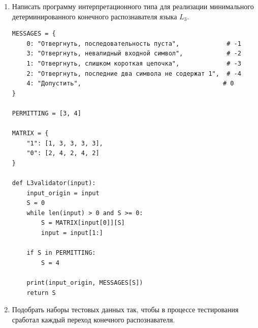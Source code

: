 \documentclass[a4paper,14pt]{extarticle}
\begin{document}
\begin{enumerate}[1.]
\begin{verbatim}
def S2(input):
    if len(input) == 0:
        return -3

    if input[0] == '1':
        return S4(input[1:])
    elif input[0] == '0':
        return S5(input[1:])
    else:
        return -2

def S3(input):
    if len(input) == 0:
        return -4

    if input[0] == '1':
        return S4(input[1:])
    elif input[0] == '0':
        return S3(input[1:])
    else:
        return -2


def S4(input):
    if len(input) == 0:
        return 0

    if input[0] == '1':
        return S4(input[1:])
    elif input[0] == '0':
        return S5(input[1:])
    else:
        return -2


def S5(input):
    if len(input) == 0:
        return 0

    if input[0] == '1':
        return S4(input[1:])
    elif input[0] == '0':
        return S3(input[1:])
    else:
        return -2

def L3validator(input):
    result = S1(input)
    print(input, MESSAGES[result])
    return result
\end{verbatim}

\item Написать программу интерпретационного типа для реализации
минимального детерминированного конечного распознавателя языка $L_3$.

\begin{verbatim}
MESSAGES = {
    0: "Отвергнуть, последовательность пуста",             # -1
    3: "Отвергнуть, невалидный входной символ",            # -2
    1: "Отвергнуть, слишком короткая цепочка",             # -3
    2: "Отвергнуть, последние два символа не содержат 1",  # -4
    4: "Допустить",                                       # 0
}

PERMITTING = [3, 4]

MATRIX = {
    "1": [1, 3, 3, 3, 3],
    "0": [2, 4, 2, 4, 2]
}

def L3validator(input):
    input_origin = input
    S = 0
    while len(input) > 0 and S >= 0:
        S = MATRIX[input[0]][S]
        input = input[1:]

    if S in PERMITTING:
        S = 4

    print(input_origin, MESSAGES[S])
    return S
\end{verbatim}

\item Подобрать наборы тестовых данных так, чтобы в процессе тестирования
сработал каждый переход конечного распознавателя.


\end{enumerate}
\end{document}
